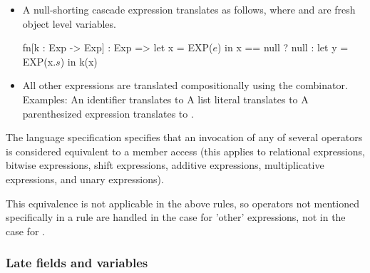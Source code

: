 \documentclass[makeidx]{article}
\begin{document}
{\begin{itemize}
  \begin{dartCode}
    fn[k : Exp -> Exp] : Exp =>
       $F$[fn[r : Exp] : Exp => let x = r in
                              let y = EXP(x.$s$)
                              in k[x]
       ]
  \end{dartCode}
\item A null-shorting cascade expression  translates as follows, where 
  and  are fresh object level variables.
  \begin{dartCode}
     fn[k : Exp -> Exp] : Exp =>
         let x = EXP($e$) in x == null ? null : let y = EXP(x.$s$) in k(x)
  \end{dartCode}
\item All other expressions are translated compositionally using the 
  combinator.  Examples:
  An identifier  translates to 
  A list literal \code{[$e_1$, \ldots, $e_n$]} translates to 
  A parenthesized expression  translates to .
\end{itemize}

The language specification specifies that an invocation of any of several
operators is considered equivalent to a member access (this applies to
relational expressions, bitwise expressions, shift expressions, additive
expressions, multiplicative expressions, and unary expressions).


This equivalence is not applicable in the above rules, so operators not
mentioned specifically in a rule are handled in the case for 'other'
expressions, not in the case for .


\subsubsection{Late fields and variables}

}
\end{document}
